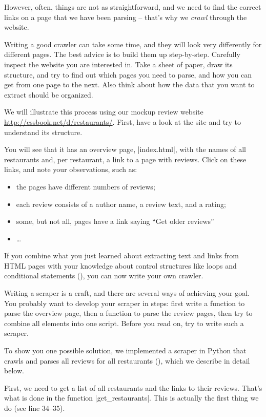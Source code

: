 However, often, things are not as straightforward, and we need to find
the correct links on a page that we have been parsing -- that's why we
\emph{crawl} through the website.

Writing a good crawler can take some time, and they will look very
differently for different pages. The best advice is to build them up
step-by-step. Carefully inspect the website you are interested in.
Take a sheet of paper, draw its structure, and try to find out which
pages you need to parse, and how you can get from one page to the next.
Also think about how the data that you want to extract should be organized.

We will illustrate this process using our mockup review website \url{http://cssbook.net/d/restaurants/}.
First, have a look at the site and try to understand its structure.

You will see that it has an overview page, |index.html|, with the
names of all restaurants and, per restaurant, a link to a page with reviews.
Click on these links, and note your observations, such as:
\begin{itemize}
\item the pages have different numbers of reviews;
\item each review consists of a author name, a review text, and a rating;
\item some, but not all, pages have a link saying ``Get older reviews''
\item \ldots
\end{itemize}

If you combine what you just learned about extracting text and links from HTML
pages with your knowledge about control structures like loops and conditional
statements (), you can now write your own crawler.

Writing a scraper is a craft, and there are several ways of achieving your goal.
You probably want to develop your scraper in steps: first write a function to
parse the overview page, then a function to parse the review pages, then try
to combine all elements into one script. Before you read on, try to write
such a scraper.

To show you one possible solution, we implemented a scraper in Python
that crawls and parses all reviews for all restaurants
(), which we describe in detail below.


First, we need to get a list of all restaurants and the links to their
reviews. That's what is done in the function |get_restaurants|. This
is actually the first thing we do (see line 34--35).


